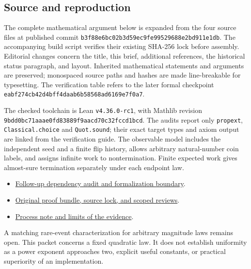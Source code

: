 \documentclass[11pt]{article}
\begin{document}
\subsection*{Source and reproduction}
The complete mathematical argument below is expanded from the four
source files at published commit
\nolinkurl{b3f88e6bc02b3d59ec9fe99529688e2bd911e1db}.
The accompanying build script verifies their existing SHA-256 lock before
assembly. Editorial changes concern the title, this brief, additional references,
the historical status paragraph, and layout. Inherited mathematical statements and arguments are preserved;
monospaced source paths and hashes are made line-breakable for typesetting.
The verification table refers to the later formal checkpoint
\nolinkurl{eabf274cb42d4bff4daab6b58568ad6169e7f0a7}.

The checked toolchain is Lean \nolinkurl{v4.36.0-rc1}, with Mathlib revision
\nolinkurl{9bdd0bc71aaae0fd83889f9aacd70c32fccd1bcd}.
The audits report only \nolinkurl{propext}, \nolinkurl{Classical.choice} and
\nolinkurl{Quot.sound}; their exact target types and axiom output are linked
from the verification guide. The observable model includes the independent
seed and a finite flip history, allows arbitrary natural-number coin labels,
and assigns infinite work to nontermination. Finite expected work gives
almost-sure termination separately under each endpoint law.

\begin{itemize}
\item \href{https://github.com/davidiach/adaptive-threshold-estimation/blob/eabf274cb42d4bff4daab6b58568ad6169e7f0a7/docs/CRITICAL_AUDIT.md}{Follow-up dependency audit and formalization boundary}.
\item \href{https://github.com/davidiach/adaptive-threshold-estimation/tree/b3f88e6bc02b3d59ec9fe99529688e2bd911e1db/research/2026-10-27-nonlinear-critical}{Original proof bundle, source lock, and scoped reviews}.
\item \href{https://github.com/davidiach/adaptive-threshold-estimation/blob/6009662a5581b31de17c8956b6fd93e4279ba087/docs/process/METHOD.md}{Process note and limits of the evidence}.
\end{itemize}

\noindent A matching rare-event characterization for arbitrary magnitude laws remains
open. This packet concerns a fixed quadratic law. It does not establish
uniformity as a power exponent approaches two, explicit useful constants,
or practical superiority of an implementation.
\end{document}
